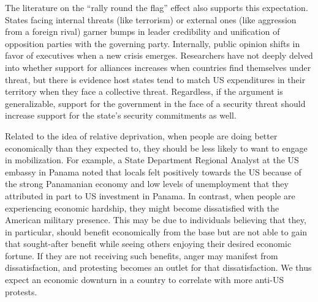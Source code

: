 		The literature on the ``rally round the flag'' effect also supports this expectation. States facing internal threats (like terrorism) or external ones (like aggression from a foreign rival) garner bumps in leader credibility and unification of opposition parties with the governing party.\cite{Chowanietz2011} Internally, public opinion shifts in favor of executives when a new crisis emerges.\cite{lee1977,Norrander1993}  Researchers have not deeply delved into whether support for alliances increases when countries find themselves under threat, but there is evidence host states tend to match US expenditures in their territory when they face a collective threat.\cite{allenetal2016} Regardless, if the argument is generalizable, support for the government in the face of a security threat should increase support for the state's security commitments as well.
		
		
		
		
		Related to the idea of relative deprivation, when people are doing better economically than they expected to, they should be less likely to want to engage in mobilization. For example, a State Department Regional Analyst at the US embassy in Panama noted that locals felt positively towards the US because of the strong Panamanian economy and low levels of unemployment that they attributed in part to US investment in Panama.\cite{embthree20180712} In contrast, when people are experiencing economic hardship, they might become dissatisfied with the American military presence.\cite[Though we note that we may see less mobilization at extreme levels of economic downturn, which would lead to extreme poverty. As pointed out by an interview subject, ``When you have to fight for your day to day surviving \text{[}sic\text{]}, you cannot be active \text{[}against bases\text{]}.''][]{berlinone20190723}  This may be due to individuals believing that they, in particular, should benefit economically from the base but are not able to gain that sought-after benefit while seeing others enjoying their desired economic fortune.  If they are not receiving such benefits, anger may manifest from dissatisfaction, and protesting becomes an outlet for that dissatisfaction. We thus expect an economic downturn in a country to correlate with more anti-US protests.
		
